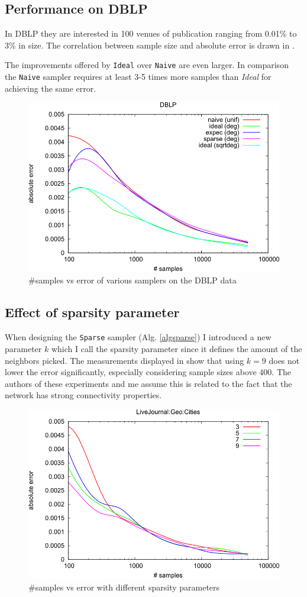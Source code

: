 \subsection{Performance on DBLP}
In DBLP they are interested in 100 venues of publication ranging from 0.01\% to 3\% in size. The correlation between sample size and absolute error is drawn in .

The improvements offered by \texttt{Ideal} over \texttt{Naive} are even larger. In comparison the \texttt{Naive} sampler requires at least 3-5 times more samples than \textit{Ideal} for achieving the same error.
\begin{figure}[!ht]
  \begin{center}
    \includegraphics[width=0.5\linewidth]{fig4}
    \caption{\#samples vs error of various samplers on the DBLP data \cite{dasgupta2012social}}
  \end{center}
\end{figure}
\subsection{Effect of sparsity parameter}
When designing the \texttt{Sparse} sampler (Alg. \ref{algsparse}) I introduced a new parameter $k$ which I call the sparsity parameter since it defines the amount of the neighbors picked.
The measurements displayed in  show that using $k=9$ does not lower the error significantly, especially considering sample sizes above 400.
The authors of these experiments and me assume this is related to the fact that the network has strong connectivity properties.
\begin{figure}[!ht]
  \begin{center}
    \includegraphics[width=0.5\linewidth]{fig7b}
    \caption{\#samples vs error with different sparsity parameters \cite{dasgupta2012social}}
  \end{center}
\end{figure}
